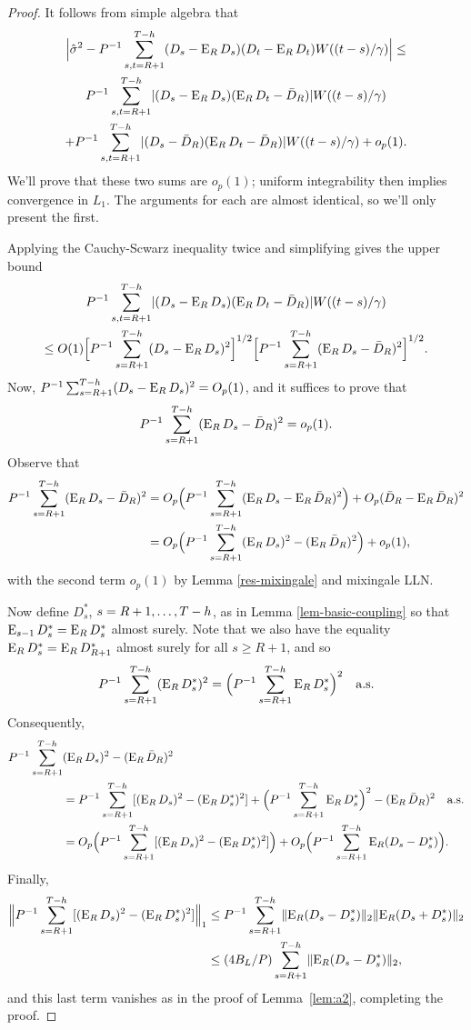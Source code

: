\documentclass[12pt]{article}
\begin{document}
\begin{proof}
   It follows from simple algebra that
\begin{multline*}
  \Big| \hat{\sigma}^2 -  P^{-1} \sum_{s,t=R+1}^{T-h} (D_s - \operatorname{E}_R
    D_s) (D_t - \operatorname{E}_R D_t) W((t-s)/\gamma) \Big| \leq\\
  P^{-1} \sum_{s,t=R+1}^{T-h} \lvert (D_s - \operatorname{E}_R D_s)(\operatorname{E}_R D_t - \bar{D}_{R}) \rvert W((t-s)/\gamma) \\ + P^{-1} \sum_{s,t=R+1}^{T-h} \lvert (D_s -
  \bar{D}_{R})(\operatorname{E}_R D_t - \bar{D}_{R}) \rvert W((t-s)/\gamma) + o_p(1).
\end{multline*}
We'll prove that these two sums are $o_p(1)$; uniform integrability
then implies convergence in $L_1$.  The arguments for each are almost
identical, so we'll only present the first.

Applying the Cauchy-Scwarz inequality twice and simplifying gives the
upper bound
\begin{multline*}
P^{-1} \sum_{s,t=R+1}^{T-h} \lvert (D_s - \operatorname{E}_R D_s)(\operatorname{E}_R D_t - \bar{D}_{R}) \rvert W((t-s)/\gamma) \\ \leq O(1) \Big[P^{-1} \sum_{s=R+1}^{T-h} (D_s - \operatorname{E}_R D_s)^2\Big]^{1/2} \Big[P^{-1} \sum_{s=R+1}^{T-h}(\operatorname{E}_R D_s - \bar{D}_{R} )^2\Big]^{1/2}.
\end{multline*}
Now,
$P^{-1} \sum_{s=R+1}^{T-h}(D_s - \operatorname{E}_R D_s)^2 = O_p(1)$, and it suffices to prove
that \[P^{-1} \sum_{s=R+1}^{T-h}(\operatorname{E}_R D_s - \bar{D}_{R} )^2 = o_p(1).\]  Observe that
\begin{align*}
  P^{-1} \sum_{s=R+1}^{T-h}(\operatorname{E}_R D_s - \bar{D}_{R} )^2 & = O_p\Big(P^{-1} \sum_{s=R+1}^{T-h}(\operatorname{E}_{R}D_s -
  \operatorname{E}_R\bar{D}_{R})^2\Big) + O_p(\bar{D}_{R} - \operatorname{E}_R\bar{D}_{R})^{2} \\
  &= O_p\Big(P^{-1} \sum_{s=R+1}^{T-h} (\operatorname{E}_RD_s)^2 - (\operatorname{E}_R\bar{D}_{R})^2\Big) +
  o_p(1),
\end{align*}
with the second term $o_p(1)$ by Lemma \ref{res-mixingale} and
 mixingale LLN.

Now define $D_s^*$, $s = R+1,\dots,T-h$, as in Lemma
\ref{lem-basic-coupling} so that $\operatorname{E}_{s-1} D_s^* = \operatorname{E}_R D_s^*$ almost
surely.  Note that we also have the equality $\operatorname{E}_R D_s^* = \operatorname{E}_R
D_{R+1}^*$ almost surely for all $s\geq R+1$, and so
\[
P^{-1} \sum_{s=R+1}^{T-h} (\operatorname{E}_R D_s^*)^2 = \Big(P^{-1} \sum_{s=R+1}^{T-h} \operatorname{E}_R
D_s^*\Big)^2 \quad \text{a.s.}
\]
Consequently,
\begin{align*}
P^{-1} \sum_{s=R+1}^{T-h}& (\operatorname{E}_R D_s)^2 - (\operatorname{E}_R\bar{D}_{R})^2 \\
&= P^{-1} \sum_{s=R+1}^{T-h} [(\operatorname{E}_R D_s)^2 - (\operatorname{E}_R D_s^*)^2]
 + \Big(P^{-1} \sum_{s=R+1}^{T-h} \operatorname{E}_R D_s^*\Big)^2 - (\operatorname{E}_R\bar{D}_{R})^2 \quad \text{a.s}.\\
&= O_p\Big(P^{-1} \sum_{s=R+1}^{T-h} [(\operatorname{E}_R D_s)^2 - (\operatorname{E}_R D_s^*)^2]\Big)
 + O_p\Big(P^{-1} \sum_{s=R+1}^{T-h} \operatorname{E}_R (D_s - D_s^*)\Big).
\end{align*}
Finally,
\begin{align*}
\Big\lVert P^{-1} \sum_{s=R+1}^{T-h} [(\operatorname{E}_RD_s)^2 - (\operatorname{E}_R D_s^*)^2] \Big\rVert_1
&\leq P^{-1} \sum_{s=R+1}^{T-h} \lVert \operatorname{E}_R (D_s - D_s^*) \rVert_2 \lVert
\operatorname{E}_R (D_s + D_s^*) \rVert_2
\\ &\leq (4 B_L/P) \sum_{s=R+1}^{T-h} \lVert \operatorname{E}_R (D_s - D_s^*) \rVert_2,
\end{align*}
and this last term vanishes as in the proof of Lemma~\ref{lem:a2},
completing the proof.
\end{proof}
\end{document}
